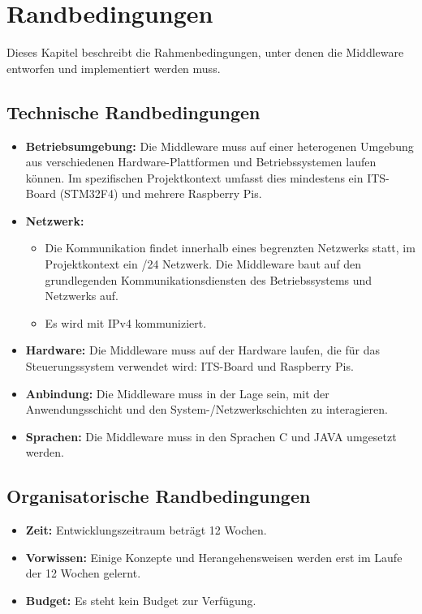 

\chapter{Randbedingungen}

Dieses Kapitel beschreibt die Rahmenbedingungen, unter denen die Middleware entworfen und implementiert werden muss.

\section{Technische Randbedingungen}


\begin{itemize}
    \item \textbf{Betriebsumgebung:}  Die Middleware muss auf einer heterogenen Umgebung aus verschiedenen Hardware-Plattformen und Betriebssystemen laufen können. Im spezifischen Projektkontext umfasst dies mindestens ein ITS-Board (STM32F4) und mehrere Raspberry Pis.
    
    \item \textbf{Netzwerk:}  
    \begin{itemize}
        \item Die Kommunikation findet innerhalb eines begrenzten Netzwerks statt, im Projektkontext ein /24 Netzwerk. Die Middleware baut auf den grundlegenden Kommunikationsdiensten des Betriebssystems und Netzwerks auf.
        \item Es wird mit IPv4 kommuniziert.
    \end{itemize}
    \item \textbf{Hardware:} Die Middleware muss auf der Hardware laufen, die für das Steuerungssystem verwendet wird: ITS-Board und Raspberry Pis. 
    \item \textbf{Anbindung:} Die Middleware muss in der Lage sein, mit der Anwendungsschicht und den System-/Netzwerkschichten zu interagieren.
    \item \textbf{Sprachen:} Die Middleware muss in den Sprachen C und JAVA umgesetzt werden.

    
\end{itemize}

\section{Organisatorische Randbedingungen}
\begin{itemize}
    \item \textbf{Zeit:} Entwicklungszeitraum beträgt 12 Wochen. 
    \item \textbf{Vorwissen:} Einige Konzepte und Herangehensweisen werden erst im Laufe der 12 Wochen gelernt.
    \item \textbf{Budget:} Es steht kein Budget zur Verfügung.

\end{itemize}



